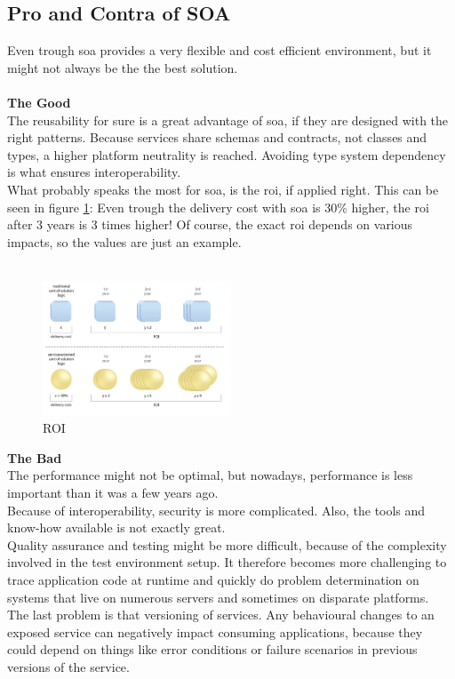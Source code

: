 \documentclass[12pt]{article}
\begin{document}
\subsection{Pro and Contra of SOA}
Even trough \gls{soa} provides a very flexible and cost efficient environment, but it might not always be the the best solution.
\\ \\
\textbf{The Good}\\
The reusability for sure is a great advantage of \gls{soa}, if they are designed with the right patterns.
Because services share schemas and contracts, not classes and types, a higher platform neutrality is reached. Avoiding type system dependency is what ensures interoperability. \\
What probably speaks the most for \gls{soa}, is the \gls{roi}, if applied right. This can be seen in figure \ref{fig:roi}: Even trough the delivery cost with \gls{soa} is 30\% higher, the \gls{roi} after 3 years is 3 times higher! Of course, the exact \gls{roi} depends on various impacts, so the values are just an example. \cite{pcsoa}\\\\
\begin{figure}[here!]
	\centering
	\includegraphics[width=0.5\textwidth]{images/roi}
	\caption{ROI \cite{roiph}}
	\label{fig:roi}
	\end{figure}
 \FloatBarrier 
\noindent
\textbf{The Bad} \\
The performance might not be optimal, but nowadays, performance is less important than it was a few years ago. \\
Because of interoperability, security is more complicated. Also, the tools and know-how available is not exactly great.\\
Quality assurance and testing might be more difficult, because of the complexity involved in the test environment setup. It therefore becomes more challenging to trace application code at runtime and quickly do problem determination on systems that live on numerous servers and sometimes on disparate platforms.
\\
The last problem is that versioning of services. Any behavioural changes to an exposed service can negatively impact consuming applications, because they could  depend on things like error conditions or failure scenarios in previous versions of the service. \cite{pcsoa}
\end{document}
